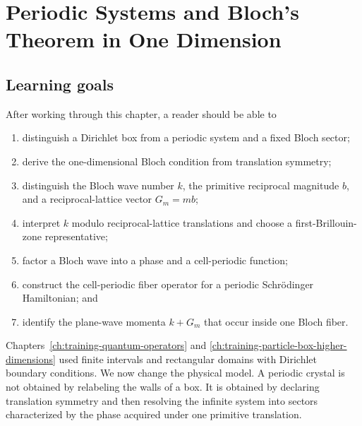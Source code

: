 \chapter{Periodic Systems and Bloch's Theorem in One Dimension}

\label{ch:training-bloch-theorem-one-dimensional}


\section{Learning goals}

After working through this chapter, a reader should be able to

\begin{enumerate}
  \item distinguish a Dirichlet box from a periodic system and a fixed Bloch
        sector;
  \item derive the one-dimensional Bloch condition from translation symmetry;
  \item distinguish the Bloch wave number $k$, the primitive reciprocal
        magnitude $b$, and a reciprocal-lattice vector $G_m=mb$;
  \item interpret $k$ modulo reciprocal-lattice translations and choose a
        first-Brillouin-zone representative;
  \item factor a Bloch wave into a phase and a cell-periodic function;
  \item construct the cell-periodic fiber operator for a periodic Schr\"odinger
        Hamiltonian; and
  \item identify the plane-wave momenta $k+G_m$ that occur inside one Bloch
        fiber.
\end{enumerate}

Chapters~\ref{ch:training-quantum-operators} and
\ref{ch:training-particle-box-higher-dimensions} used finite intervals and
rectangular domains with Dirichlet boundary conditions. We now change the
physical model. A periodic crystal is not obtained by relabeling the walls of a
box. It is obtained by declaring translation symmetry and then resolving the
infinite system into sectors characterized by the phase acquired under one
primitive translation.

